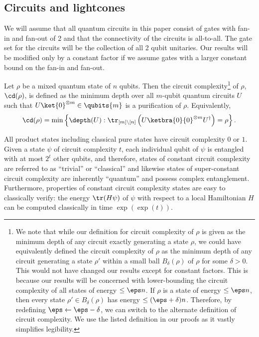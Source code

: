 \documentclass{toc}
\begin{document}
\subsection{Circuits and lightcones}

We will assume that all quantum circuits in this %
paper  %
consist of gates with fan-in and fan-out of 2 and that the connectivity of the circuits is all-to-all. The gate set for the circuits will be the collection of all 2 qubit unitaries. Our results will be modified only by a constant factor if we assume gates with a larger constant bound on the fan-in and fan-out.

\begin{definition}
\label{def:cc}
Let $\rho$ be a mixed quantum state of $n$ qubits. Then the circuit complexity\footnote{We note that while our definition for circuit complexity of $\rho$ is given as the minimum depth of any circuit exactly generating a state $\rho$, we could have equivalently defined the circuit complexity of $\rho$ as the minimum depth of any circuit generating a state $\rho'$ within a small ball $B_\delta(\rho)$ of $\rho$ for some $\delta > 0$. This would not have changed our results except for constant factors. This is because our results will be concerned with lower-bounding the circuit complexity of all states of energy $\leq \eps n$. If $\rho$ is a state of energy $\leq \eps n$, then every state $\rho' \in B_\delta(\rho)$ has energy $\leq (\eps + \delta) n$. Therefore, by redefining $\eps \leftarrow \eps - \delta$, we can switch to the alternate definition of circuit complexity. We use the listed definition in our proofs as it vastly simplifies legibility.} of $\rho$, $\cd(\rho)$, is defined as the minimum depth over all $m$-qubit quantum circuits $U$ such that $U \ket{0}^{\otimes m} \in \qubits{m}$ is a purification of $\rho$. Equivalently,
\begin{align}
\cd(\rho) = \min \left\{ \depth(U) : \tr_{[m] \setminus [n]}\left(U \ketbra{0}{0}^{\otimes m} U^\dagger \right) = \rho \right\}.
\end{align}
\end{definition}

%

All product states including classical pure states have circuit complexity $0$ or $1$.
Given a state $\psi$ of circuit complexity $t$, each individual qubit of $\psi$ is entangled with at most $2^t$ other qubits, and therefore, states of constant circuit complexity are referred to as ``trivial'' or ``classical'' and likewise states of super-constant circuit complexity are inherently ``quantum'' and possess complex entanglement. Furthermore, properties of constant circuit complexity states are easy to classically verify: the energy $\tr(H \psi)$ of $\psi$ with respect to a local Hamiltonian $H$ can be computed classically in time $\exp(\exp(t))$. 
\end{document}
